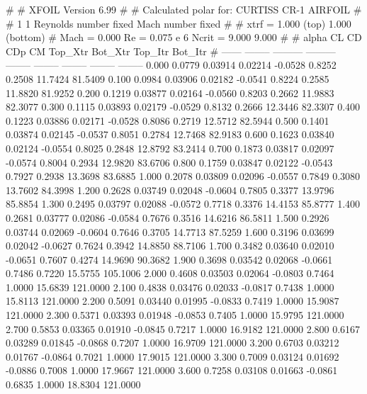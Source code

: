 #  
#       XFOIL         Version 6.99
#  
# Calculated polar for: CURTISS CR-1 AIRFOIL                            
#  
# 1 1 Reynolds number fixed          Mach number fixed         
#  
# xtrf =   1.000 (top)        1.000 (bottom)  
# Mach =   0.000     Re =     0.075 e 6     Ncrit =   9.000  9.000
#  
#   alpha    CL        CD       CDp       CM     Top_Xtr  Bot_Xtr  Top_Itr  Bot_Itr
#  ------ -------- --------- --------- -------- -------- -------- -------- --------
   0.000   0.0779   0.03914   0.02214  -0.0528   0.8252   0.2508  11.7424  81.5409
   0.100   0.0984   0.03906   0.02182  -0.0541   0.8224   0.2585  11.8820  81.9252
   0.200   0.1219   0.03877   0.02164  -0.0560   0.8203   0.2662  11.9883  82.3077
   0.300   0.1115   0.03893   0.02179  -0.0529   0.8132   0.2666  12.3446  82.3307
   0.400   0.1223   0.03886   0.02171  -0.0528   0.8086   0.2719  12.5712  82.5944
   0.500   0.1401   0.03874   0.02145  -0.0537   0.8051   0.2784  12.7468  82.9183
   0.600   0.1623   0.03840   0.02124  -0.0554   0.8025   0.2848  12.8792  83.2414
   0.700   0.1873   0.03817   0.02097  -0.0574   0.8004   0.2934  12.9820  83.6706
   0.800   0.1759   0.03847   0.02122  -0.0543   0.7927   0.2938  13.3698  83.6885
   1.000   0.2078   0.03809   0.02096  -0.0557   0.7849   0.3080  13.7602  84.3998
   1.200   0.2628   0.03749   0.02048  -0.0604   0.7805   0.3377  13.9796  85.8854
   1.300   0.2495   0.03797   0.02088  -0.0572   0.7718   0.3376  14.4153  85.8777
   1.400   0.2681   0.03777   0.02086  -0.0584   0.7676   0.3516  14.6216  86.5811
   1.500   0.2926   0.03744   0.02069  -0.0604   0.7646   0.3705  14.7713  87.5259
   1.600   0.3196   0.03699   0.02042  -0.0627   0.7624   0.3942  14.8850  88.7106
   1.700   0.3482   0.03640   0.02010  -0.0651   0.7607   0.4274  14.9690  90.3682
   1.900   0.3698   0.03542   0.02068  -0.0661   0.7486   0.7220  15.5755 105.1006
   2.000   0.4608   0.03503   0.02064  -0.0803   0.7464   1.0000  15.6839 121.0000
   2.100   0.4838   0.03476   0.02033  -0.0817   0.7438   1.0000  15.8113 121.0000
   2.200   0.5091   0.03440   0.01995  -0.0833   0.7419   1.0000  15.9087 121.0000
   2.300   0.5371   0.03393   0.01948  -0.0853   0.7405   1.0000  15.9795 121.0000
   2.700   0.5853   0.03365   0.01910  -0.0845   0.7217   1.0000  16.9182 121.0000
   2.800   0.6167   0.03289   0.01845  -0.0868   0.7207   1.0000  16.9709 121.0000
   3.200   0.6703   0.03212   0.01767  -0.0864   0.7021   1.0000  17.9015 121.0000
   3.300   0.7009   0.03124   0.01692  -0.0886   0.7008   1.0000  17.9667 121.0000
   3.600   0.7258   0.03108   0.01663  -0.0861   0.6835   1.0000  18.8304 121.0000
